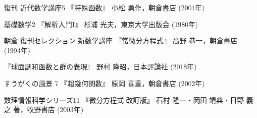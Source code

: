 \documentclass[b5paper,draft]{ltjsbook}
\begin{document}
\begin{thebibliography}{9}
     復刊 近代数学講座5 『特殊函数』 小松 勇作，朝倉書店 (2004年)

     基礎数学2 『解析入門I』 杉浦 光夫，東京大学出版会 (1980年)

     朝倉 復刊セレクション 新数学講座 『常微分方程式』 高野 恭一，朝倉書店 (1994年)

     『球面調和函数と群の表現』 野村 隆昭，日本評論社 (2018年)

     すうがくの風景 7 『超幾何関数』 原岡 喜重，朝倉書店 (2002年)

     数理情報科学シリーズ11 『微分方程式 改訂版』 石村 隆一・岡田 靖典・日野 義之 著，牧野書店 (2003年)




\end{thebibliography}
\end{document}

